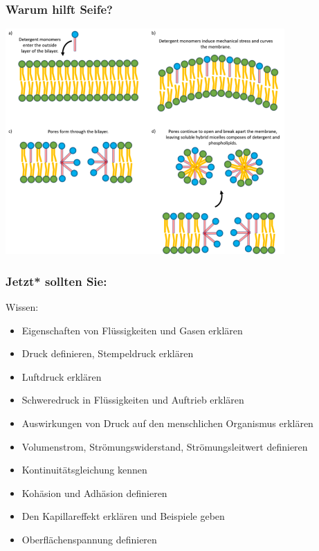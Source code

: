 \documentclass{beamer}
\begin{document}
\begin{frame}
\begin{columns}[c]
\end{columns}


\end{frame}

\begin{frame}
\frametitle{Warum hilft Seife?}

\begin{center}
\includegraphics[width=0.8\textwidth]{soap_action.png}
\end{center}

\end{frame}





\begin{frame}

\frametitle{Jetzt* sollten Sie:}



\begin{block}{Wissen:}
\begin{itemize}
\item
Eigenschaften von Flüssigkeiten und Gasen erklären
\item
Druck definieren, Stempeldruck erklären
\item
Luftdruck erklären 
\item
Schweredruck in Flüssigkeiten und Auftrieb erklären
\item
Auswirkungen von Druck auf den menschlichen Organismus erklären
\item
Volumenstrom, Strömungswiderstand, Strömungsleitwert definieren 
\item
Kontinuitätsgleichung kennen 
\item
Kohäsion und Adhäsion definieren
\item
Den Kapillareffekt erklären und Beispiele geben
\item
Oberflächenspannung definieren
\end{itemize}

\end{block}

\end{frame}
\end{document}
